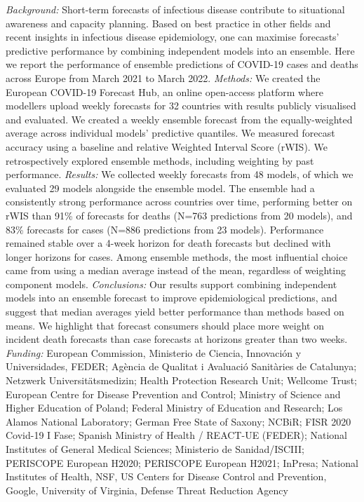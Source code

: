 \documentclass[
]{article}
\begin{document}
\emph{Background:} Short-term forecasts of infectious disease contribute to situational awareness and capacity planning. Based on best practice in other fields and recent insights in infectious disease epidemiology, one can maximise forecasts' predictive performance by combining independent models into an ensemble. Here we report the performance of ensemble predictions of COVID-19 cases and deaths across Europe from March 2021 to March 2022. \emph{Methods:} We created the European COVID-19 Forecast Hub, an online open-access platform where modellers upload weekly forecasts for 32 countries with results publicly visualised and evaluated. We created a weekly ensemble forecast from the equally-weighted average across individual models' predictive quantiles. We measured forecast accuracy using a baseline and relative Weighted Interval Score (rWIS). We retrospectively explored ensemble methods, including weighting by past performance. \emph{Results:} We collected weekly forecasts from 48 models, of which we evaluated 29 models alongside the ensemble model. The ensemble had a consistently strong performance across countries over time, performing better on rWIS than 91\% of forecasts for deaths (N=763 predictions from 20 models), and 83\% forecasts for cases (N=886 predictions from 23 models). Performance remained stable over a 4-week horizon for death forecasts but declined with longer horizons for cases. Among ensemble methods, the most influential choice came from using a median average instead of the mean, regardless of weighting component models. \emph{Conclusions:} Our results support combining independent models into an ensemble forecast to improve epidemiological predictions, and suggest that median averages yield better performance than methods based on means. We highlight that forecast consumers should place more weight on incident death forecasts than case forecasts at horizons greater than two weeks. \emph{Funding:} European Commission, Ministerio de Ciencia, Innovación y Universidades, FEDER; Agència de Qualitat i Avaluació Sanitàries de Catalunya; Netzwerk Universitätsmedizin; Health Protection Research Unit; Wellcome Trust; European Centre for Disease Prevention and Control; Ministry of Science and Higher Education of Poland; Federal Ministry of Education and Research; Los Alamos National Laboratory; German Free State of Saxony; NCBiR; FISR 2020 Covid-19 I Fase; Spanish Ministry of Health / REACT-UE (FEDER); National Institutes of General Medical Sciences; Ministerio de Sanidad/ISCIII; PERISCOPE European H2020; PERISCOPE European H2021; InPresa; National Institutes of Health, NSF, US Centers for Disease Control and Prevention, Google, University of Virginia, Defense Threat Reduction Agency
\end{document}
